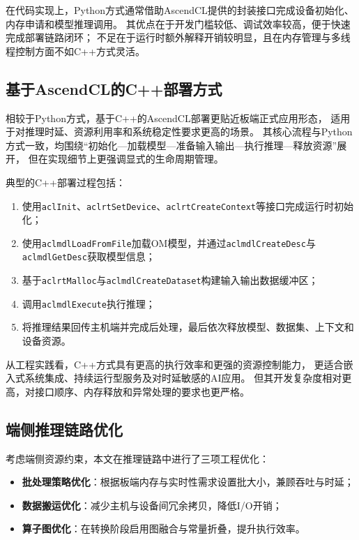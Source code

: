 在代码实现上，Python方式通常借助AscendCL提供的封装接口完成设备初始化、内存申请和模型推理调用。
其优点在于开发门槛较低、调试效率较高，便于快速完成部署链路闭环；
不足在于运行时额外解释开销较明显，且在内存管理与多线程控制方面不如C++方式灵活。

\subsection{基于AscendCL的C++部署方式}

相较于Python方式，基于C++的AscendCL部署更贴近板端正式应用形态，
适用于对推理时延、资源利用率和系统稳定性要求更高的场景。
其核心流程与Python方式一致，均围绕“初始化—加载模型—准备输入输出—执行推理—释放资源”展开，
但在实现细节上更强调显式的生命周期管理。

典型的C++部署过程包括：
\begin{enumerate}[nosep,leftmargin=*]
	\item 使用\texttt{aclInit}、\texttt{aclrtSetDevice}、\texttt{aclrtCreateContext}等接口完成运行时初始化；
	\item 使用\texttt{aclmdlLoadFromFile}加载OM模型，并通过\texttt{aclmdlCreateDesc}与\texttt{aclmdlGetDesc}获取模型信息；
	\item 基于\texttt{aclrtMalloc}与\texttt{aclmdlCreateDataset}构建输入输出数据缓冲区；
	\item 调用\texttt{aclmdlExecute}执行推理；
	\item 将推理结果回传主机端并完成后处理，最后依次释放模型、数据集、上下文和设备资源。
\end{enumerate}

从工程实践看，C++方式具有更高的执行效率和更强的资源控制能力，
更适合嵌入式系统集成、持续运行型服务及对时延敏感的AI应用。
但其开发复杂度相对更高，对接口顺序、内存释放和异常处理的要求也更严格。

\subsection{端侧推理链路优化}

考虑端侧资源约束，本文在推理链路中进行了三项工程优化：
\begin{itemize}[nosep,leftmargin=*]
	\item \textbf{批处理策略优化}：根据板端内存与实时性需求设置批大小，兼顾吞吐与时延；
	\item \textbf{数据搬运优化}：减少主机与设备间冗余拷贝，降低I/O开销；
	\item \textbf{算子图优化}：在转换阶段启用图融合与常量折叠，提升执行效率。
\end{itemize}


